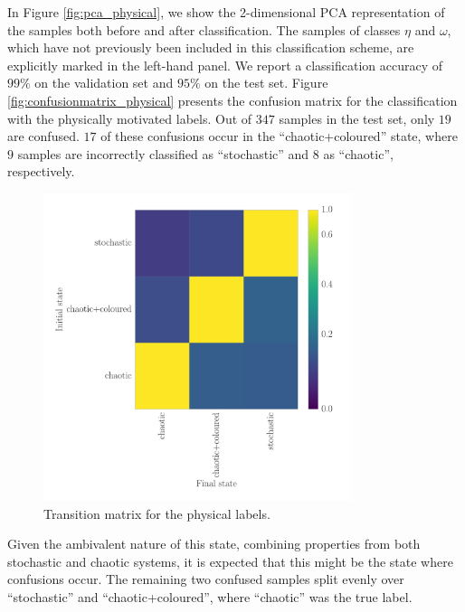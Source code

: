 \documentclass[12pt]{emulateapj}
\begin{document}
In Figure \ref{fig:pca_physical}, we show the 2-dimensional PCA representation of the samples both before and after classification. The samples of classes $\eta$ and $\omega$, which have not previously been included in this classification scheme, are explicitly marked in the left-hand panel. 
We report a classification accuracy of $99\%$ on the validation set and $95\%$ on the test set. Figure \ref{fig:confusionmatrix_physical} presents the confusion matrix for the classification with the physically motivated labels.
Out of $347$ samples in the test set, only $19$ are confused. $17$ of these confusions occur in the ``chaotic+coloured'' state, where $9$ samples are incorrectly 
classified as ``stochastic'' and $8$ as ``chaotic'', respectively. 
\begin{figure}[htbp]
\begin{center}
\includegraphics[width=9cm]{grs1915_supervised_phys_transmat.pdf}
\caption{Transition matrix for the physical labels.} 
\label{fig:transmat_phys}
\end{center}
\end{figure}
Given the ambivalent nature of this state, combining properties from both stochastic and chaotic systems, it is expected that this might be the state where confusions occur. The remaining two confused samples split evenly over ``stochastic'' and ``chaotic+coloured'', where ``chaotic'' was the true label.
\end{document}
